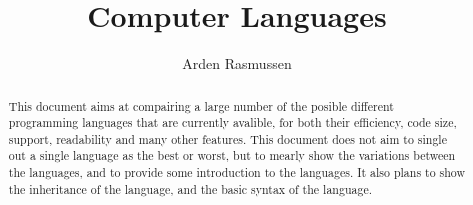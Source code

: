 \documentclass[10pt]{article}
\title{Computer Languages}
\author{Arden Rasmussen}
\begin{document}
\maketitle
\newpage

\begin{abstract}\label{abstract}
   This document aims at compairing a large number of the posible different
   programming languages that are currently avalible, for both their
   efficiency, code size, support, readability and many other features. This
   document does not aim to single out a single language as the best or worst,
   but to mearly show the variations between the languages, and to provide some
   introduction to the languages. It also plans to show the inheritance of the
   language, and the basic syntax of the language.
\end{abstract}

\newpage
\tableofcontents
\newpage
{}


















\end{document}
